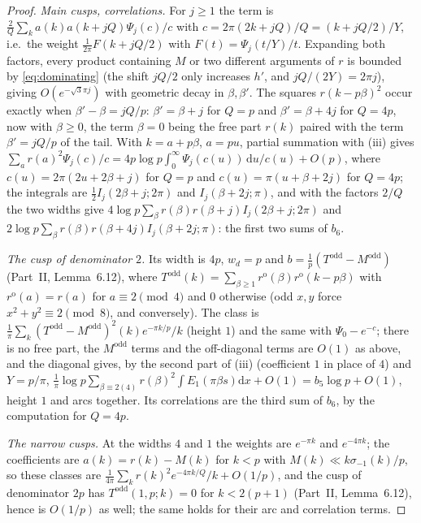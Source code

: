 \documentclass[11pt]{amsart}
\theoremstyle{remark}
\newcommand{\dd}{\mathrm{d}}
\begin{document}
\begin{proof}
\emph{Main cusps, correlations.} For $j\ge1$ the term is $\frac2Q\sum_ka(k)a(k+jQ)\Psi_j(c)/c$ with $c=2\pi(2k+jQ)/Q=(k+jQ/2)/Y$, i.e.\ the weight $\frac1{2\pi}F(k+jQ/2)$ with $F(t)=\Psi_j(t/Y)/t$. Expanding both factors, every product containing $M$ or two different arguments of $r$ is bounded by \eqref{eq:dominating} (the shift $jQ/2$ only increases $h'$, and $jQ/(2Y)=2\pi j$), giving $O(e^{-\sqrt3\pi j})$ with geometric decay in $\beta,\beta'$. The squares $r(k-p\beta)^2$ occur exactly when $\beta'-\beta=jQ/p$: $\beta'=\beta+j$ for $Q=p$ and $\beta'=\beta+4j$ for $Q=4p$, now with $\beta\ge0$, the term $\beta=0$ being the free part $r(k)$ paired with the term $\beta'=jQ/p$ of the tail. With $k=a+p\beta$, $a=pu$, partial summation with (iii) gives $\sum_ar(a)^2\Psi_j(c)/c=4p\log p\int_0^\infty\Psi_j(c(u))\,\dd u/c(u)+O(p)$, where $c(u)=2\pi(2u+2\beta+j)$ for $Q=p$ and $c(u)=\pi(u+\beta+2j)$ for $Q=4p$; the integrals are $\frac12I_j(2\beta+j;2\pi)$ and $I_j(\beta+2j;\pi)$, and with the factors $2/Q$ the two widths give $4\log p\sum_\beta r(\beta)r(\beta+j)I_j(2\beta+j;2\pi)$ and $2\log p\sum_\beta r(\beta)r(\beta+4j)I_j(\beta+2j;\pi)$: the first two sums of $b_6$.

\emph{The cusp of denominator $2$.} Its width is $4p$, $w_d=p$ and $b=\frac1p(T^{\mathrm{odd}}-M^{\mathrm{odd}})$ (Part~II, Lemma~6.12), where $T^{\mathrm{odd}}(k)=\sum_{\beta\ge1}r^{\mathrm{o}}(\beta)r^{\mathrm{o}}(k-p\beta)$ with $r^{\mathrm{o}}(a)=r(a)$ for $a\equiv2\pmod4$ and $0$ otherwise (odd $x,y$ force $x^2+y^2\equiv2\pmod8$, and conversely). The class is $\frac1\pi\sum_k(T^{\mathrm{odd}}-M^{\mathrm{odd}})^2(k)e^{-\pi k/p}/k$ (height $1$) and the same with $\Psi_0-e^{-c}$; there is no free part, the $M^{\mathrm{odd}}$ terms and the off-diagonal terms are $O(1)$ as above, and the diagonal gives, by the second part of (iii) (coefficient $1$ in place of $4$) and $Y=p/\pi$, $\frac1\pi\log p\sum_{\beta\equiv2(4)}r(\beta)^2\int E_1(\pi\beta s)\dd x+O(1)=b_5\log p+O(1)$, height $1$ and arcs together. Its correlations are the third sum of $b_6$, by the computation for $Q=4p$.

\emph{The narrow cusps.} At the widths $4$ and $1$ the weights are $e^{-\pi k}$ and $e^{-4\pi k}$; the coefficients are $a(k)=r(k)-M(k)$ for $k<p$ with $M(k)\ll k\sigma_{-1}(k)/p$, so these classes are $\frac1{4\pi}\sum_kr(k)^2e^{-4\pi k/Q}/k+O(1/p)$, and the cusp of denominator $2p$ has $T^{\mathrm{odd}}(1,p;k)=0$ for $k<2(p+1)$ (Part~II, Lemma~6.12), hence is $O(1/p)$ as well; the same holds for their arc and correlation terms.


\end{proof}
\end{document}
